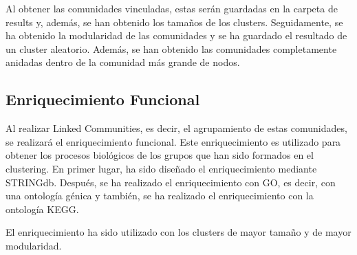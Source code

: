 Al obtener las comunidades vinculadas, estas serán guardadas en la carpeta de results y, además, se han obtenido los tamaños de los clusters. Seguidamente, se ha obtenido la modularidad de las comunidades y se ha guardado el resultado de un cluster aleatorio.
Además, se han obtenido las comunidades completamente anidadas dentro de la comunidad más grande de nodos.

\subsection{Enriquecimiento Funcional}
Al realizar Linked Communities, es decir, el agrupamiento de estas comunidades, se realizará el enriquecimiento funcional. Este enriquecimiento es utilizado para obtener los procesos biológicos de los grupos que han sido formados en el clustering.
En primer lugar, ha sido diseñado el enriquecimiento mediante STRINGdb. Después, se ha realizado el enriquecimiento con GO, es decir, con una ontología génica y también, se ha realizado el enriquecimiento con la ontología KEGG. 

El enriquecimiento ha sido utilizado con los clusters de mayor tamaño y de mayor modularidad.

 